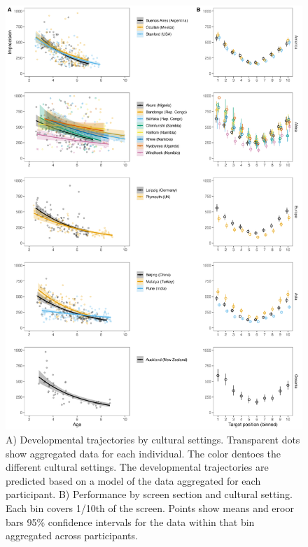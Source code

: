 \documentclass[
  man,floatsintext]{apa6}
\begin{document}
\begin{figure}

{\centering \includegraphics[width=0.75\linewidth]{../visuals/pvis_pred} 

}

\caption{A) Developmental trajectories by cultural settings. Transparent dots show aggregated data for each individual. The color dentoes the different cultural settings. The developmental trajectories are predicted based on a model of the data aggregated for each participant. B) Performance by screen section and cultural setting. Each bin covers 1/10th of the screen. Points show means and eroor bars 95\% confidence intervals for the data within that bin aggregated across participants.}\label{fig:fig2}
\end{figure}
\end{document}
